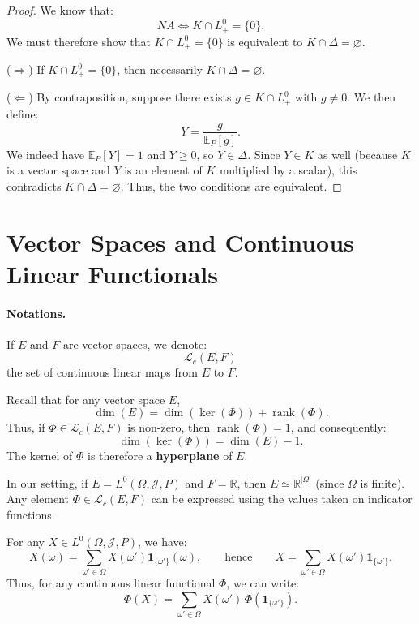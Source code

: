 \begin{proof}
We know that:
\[
NA \Longleftrightarrow K \cap L_+^0 = \{0\}.
\]
We must therefore show that $K \cap L_+^0 = \{0\}$ is equivalent to $K \cap \Delta = \varnothing$.

\medskip
\noindent
($\Rightarrow$)  
If $K \cap L_+^0 = \{0\}$, then necessarily $K \cap \Delta = \varnothing$.

\medskip
\noindent
($\Leftarrow$)  
By contraposition, suppose there exists $g \in K \cap L_+^0$ with $g \neq 0$.  
We then define:
\[
Y = \frac{g}{\mathbb{E}_P[g]}.
\]
We indeed have $\mathbb{E}_P[Y] = 1$ and $Y \ge 0$, so $Y \in \Delta$.  
Since $Y \in K$ as well (because $K$ is a vector space and $Y$ is an element of $K$ multiplied by a scalar), this contradicts $K \cap \Delta = \varnothing$.  
Thus, the two conditions are equivalent.
\end{proof}

\section{Vector Spaces and Continuous Linear Functionals}

\paragraph{Notations.}
If $E$ and $F$ are vector spaces, we denote:
\[
\mathcal{L}_c(E,F)
\]
the set of continuous linear maps from $E$ to $F$.

\medskip
\noindent
Recall that for any vector space $E$, 
\[
\dim(E) = \dim(\ker(\Phi)) + \operatorname{rank}(\Phi).
\]
Thus, if $\Phi \in \mathcal{L}_c(E,F)$ is non-zero, then $\operatorname{rank}(\Phi)=1$, and consequently:
\[
\dim(\ker(\Phi)) = \dim(E) - 1.
\]
The kernel of $\Phi$ is therefore a \textbf{hyperplane} of $E$.

\medskip
\noindent
In our setting, if $E = L^0(\Omega, \mathcal{J}, P)$ and $F = \mathbb{R}$, then $E \simeq \mathbb{R}^{|\Omega|}$ (since $\Omega$ is finite).  
Any element $\Phi \in \mathcal{L}_c(E,F)$ can be expressed using the values taken on indicator functions.

For any $X \in L^0(\Omega, \mathcal{J}, P)$, we have:
\[
X(\omega) = \sum_{\omega' \in \Omega} X(\omega') \mathbf{1}_{\{\omega'\}}(\omega),
\qquad \text{hence} \qquad
X = \sum_{\omega' \in \Omega} X(\omega') \mathbf{1}_{\{\omega'\}}.
\]
Thus, for any continuous linear functional $\Phi$, we can write:
\[
\Phi(X) = \sum_{\omega' \in \Omega} X(\omega') \, \Phi(\mathbf{1}_{\{\omega'\}}).
\]

